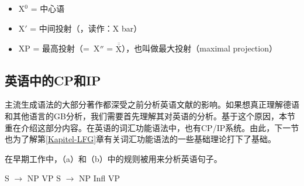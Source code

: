 \begin{itemize}
\item X$^0$ = 中心语
\item X$'$ = 中间投射（\xbar ，读作：X bar）
\item XP = 最高投射（=~X$''$ = $\overline{\overline{\mbox{X}}}$），也叫做最大投射（maximal projection） 
\end{itemize}

\subsection{英语中的CP和IP}
\label{Abschnitt-GB-CP-IP-System-Englisch}\label{sec-GB-CP-IP-System-English}

主流生成语法的大部分著作都深受之前分析英语文献的影响。如果想真正理解德语和其他语言的GB分析，我们需要首先理解其对英语的分析。基于这个原因，本节重在介绍这部分内容。在英语的词汇功能语法中，也有CP/IP系统。由此，下一节也为了解第\ref{Kapitel-LFG}章有关词汇功能语法的一些基础理论打下了基础。

在早期工作中，（a）和（b）中的规则被用来分析英语句子\citep[]{Chomsky81a}。

\eal
\ex S $\to$ NP VP
\ex S $\to$ NP Infl VP
\zl

